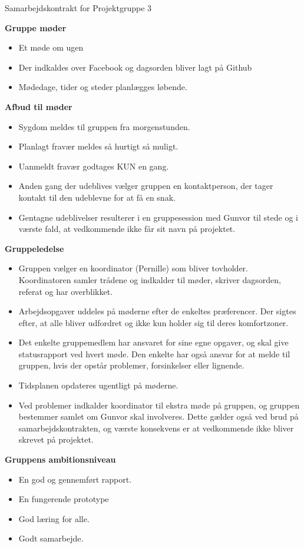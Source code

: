 \documentclass{article}
\begin{document}
	{\Large Samarbejdskontrakt for Projektgruppe 3}
	
	\textbf{Gruppe møder}
	\begin{itemize}
		\item Et møde om ugen
		\item Der indkaldes over Facebook og dagsorden bliver lagt på Github
		\item Mødedage, tider og steder planlægges løbende.
	\end{itemize}
	
	\textbf{Afbud til møder}
	\begin{itemize}
		\item Sygdom meldes til gruppen fra morgenstunden.
		\item Planlagt fravær meldes så hurtigt så muligt.
		\item Uanmeldt fravær godtages KUN en gang.
		\item Anden gang der udeblives vælger gruppen en kontaktperson, der tager kontakt til den udeblevne for at få en snak.
		\item Gentagne udeblivelser resulterer i en gruppesession med Gunvor til stede og i værste fald, at vedkommende ikke får sit navn på projektet.
	\end{itemize}
	
	\textbf{Gruppeledelse}
	\begin{itemize}
		\item Gruppen vælger en koordinator (Pernille) som bliver tovholder. Koordinatoren samler trådene og indkalder til møder, skriver dagsorden, referat og har overblikket.
		\item Arbejdsopgaver uddeles på møderne efter de enkeltes præferencer. Der sigtes efter, at alle bliver udfordret og ikke kun holder sig til deres komfortzoner. 
		\item Det enkelte gruppemedlem har ansvaret for sine egne opgaver, og skal give statusrapport ved hvert møde. Den enkelte har også ansvar for at melde til gruppen, hvis der opstår problemer, forsinkelser eller lignende.
		\item Tidsplanen opdateres ugentligt på møderne.
		\item Ved problemer indkalder koordinator til ekstra møde på gruppen, og gruppen bestemmer samlet om Gunvor skal involveres. Dette gælder også ved brud på samarbejdskontrakten, og værste konsekvens er at vedkommende ikke bliver skrevet på projektet.
	\end{itemize}
	
	\textbf{Gruppens ambitionsniveau}
	\begin{itemize}
		\item En god og gennemført rapport.
		\item En fungerende prototype
		\item God læring for alle.
		\item Godt samarbejde.
		
	
	\end{itemize}
\end{document}
